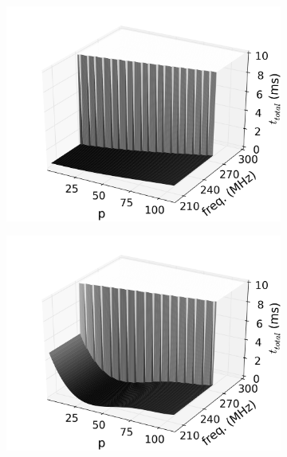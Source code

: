 \documentclass[runningheads,a4paper]{llncs}
\begin{document}
\begin{figure}
        \centering
        \begin{subfigure}{0.31\textwidth}
                \centering
                \includegraphics[width=\textwidth]{./figs/surmodel000_13.png}
        \end{subfigure}
        \begin{subfigure}{0.31\textwidth}
                \centering
                \includegraphics[width=\textwidth]{./figs/surmodel009_14.png}
        \end{subfigure}
        \begin{subfigure}{0.31\textwidth}

\end{subfigure}
\end{figure}
\end{document}
